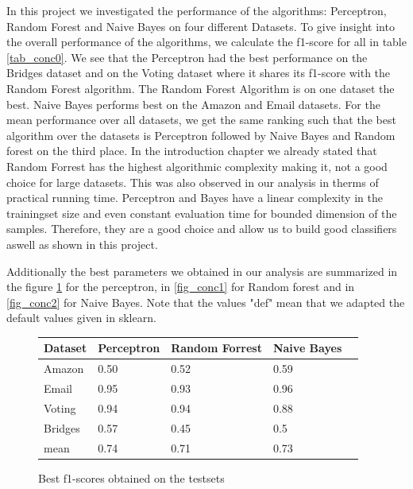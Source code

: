 \documentclass[11pt]{article}
\begin{document}
In this project we investigated the performance of the algorithms: Perceptron, Random Forest and Naive Bayes on four different Datasets. To give insight into the overall performance of the algorithms, we calculate the f1-score for all in table \ref{tab_conc0}. We see that the Perceptron had the best performance on the Bridges dataset and on the Voting dataset where it shares its f1-score with the Random Forest algorithm. The Random Forest Algorithm is on one dataset the best. Naive Bayes performs best on the Amazon and Email datasets. For the mean performance over all datasets, we get the same ranking such that the best algorithm over the datasets is Perceptron followed by Naive Bayes and Random forest on the third place. In the introduction chapter we already stated that Random Forrest has the highest algorithmic complexity making it, not a good choice for large datasets. This was also observed in our analysis in therms of practical running time. Perceptron and Bayes have a linear complexity in the trainingset size and even constant evaluation time for bounded dimension of the samples. Therefore, they are a good choice and allow us to build good classifiers aswell as shown in this project.

Additionally the best parameters we obtained in our analysis are summarized in the figure \ref{fig_conc0} for the perceptron, in \ref{fig_conc1} for Random forest and in \ref{fig_conc2} for Naive Bayes. Note that the values "def" mean that we adapted the default values given in sklearn.  

\begin{figure}
\center
  \begin{tabular}{ | l | l | l | l | l |}
    \hline
    Dataset & Perceptron & Random Forrest  & Naive Bayes \\ \hline
    Amazon  & 0.50			   		 		 & 0.52\cellcolor{gray!25}   	 	   & 0.59\cellcolor{gray!50} \\ \hline
	Email   & 0.95\cellcolor{gray!25}  	 	 & 0.93   		   					   & 0.96\cellcolor{gray!50} \\ \hline
	Voting  & 0.94\cellcolor{gray!50}  	 	 & 0.94\cellcolor{gray!50}   		   & 0.88 	     		     \\ \hline
	Bridges & 0.57\cellcolor{gray!50}  	 	 & 0.45   		   					   & 0.5\cellcolor{gray!25}  \\ \hline
	mean    & 0.74\cellcolor{gray!50}  	 	 & 0.71   		   					   & 0.73\cellcolor{gray!25}  \\ \hline
  \end{tabular}
  \caption{Best f1-scores obtained on the testsets}
  \label{fig_conc0}
\end{figure}
\end{document}
